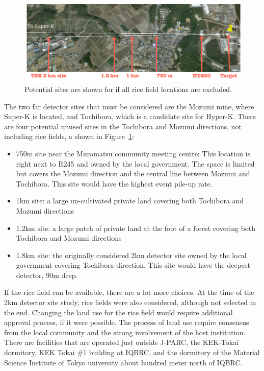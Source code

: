 \begin{figure}[htpb]
\centering\includegraphics[width=15cm,angle=0]{figures/nuprismsites.pdf}
\caption{Potential sites are shown for \nuprism if all rice field locations are excluded.}
\label{fig:detsites}
\end{figure}


The two far detector sites that must be considered are the Mozumi mine, where Super-K is located, and Tochibora, which is a candidate site for Hyper-K. There are four potential unused sites in the Tochibora and Mozumi directions, not including rice fields, a shown in Figure~\ref{fig:detsites}:
\begin{itemize}
\item 750m site near the Muramatsu community meeting centre:
          This location is right next to R245 and owned by the local government. The space is limited but covers the 
          Mozumi direction and the central line between Mozumi and Tochibora. This site would have the highest event pile-up rate.
\item 1km site: a large un-cultivated private land covering both Tochibora and Mozumi directions
\item 1.2km site: a large patch of private land at the foot of a forest covering both Tochibora and Mozumi directions
\item 1.8km site: the originally considered 2km detector site owned by the local government covering Tochibora direction. This site would have the deepest detector, 90m deep.
\end{itemize}
If the rice field can be available, there are a lot more choices. At the time of the 2km detector site study, rice fields were also considered, although not selected in the end. Changing the land use for the rice field would require additional approval process, if it were possible. 
The process of land use require consensus from the local community and the strong involvement of the host institution. There are facilities that are operated just outside J-PARC, the KEK-Tokai dormitory, KEK Tokai \#1 building at IQBRC, and  the dormitory of the Material Science Institute of Tokyo university about hundred meter north of IQBRC.

